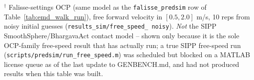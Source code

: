 $^\dagger$ Falisse-settings OCP (same model as the \texttt{falisse\_predsim}
row of Table~\ref{tab:emd_walk_run}), free forward velocity in $[0.5, 2.0]$
m/s, 10 reps from noisy initial guesses (\texttt{results\_sim/free\_speed\_
noisy}). \emph{Not} the SIPP SmoothSphere/BhargavaAct contact model -- shown
only because it is the sole OCP-family free-speed result that has actually
run; a true SIPP free-speed run (\texttt{scripts/predsim/run\_free\_speed.m})
was scheduled but blocked on a MATLAB license queue as of the last update to
GENBENCH.md, and had not produced results when this table was built.

